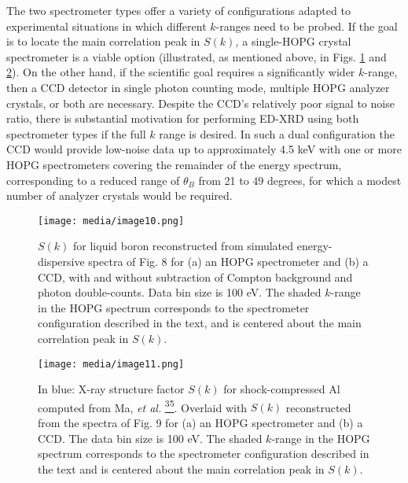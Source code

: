 The two spectrometer types offer a variety of configurations adapted to
experimental situations in which different \(k\)-ranges need to be
probed. If the goal is to locate the main correlation peak in
\(S(k)\)\emph{,} a single-HOPG crystal spectrometer is a viable option
(illustrated, as mentioned above, in Figs. \ref{edimage10} and \ref{edimage11}). On the other
hand, if the scientific goal requires a significantly wider \(k\)-range,
then a CCD detector in single photon counting mode, multiple HOPG
analyzer crystals, or both are necessary. Despite the CCD's relatively
poor signal to noise ratio, there is substantial motivation for
performing ED-XRD using both spectrometer types if the full \(k\) range
is desired. In such a dual configuration the CCD would provide low-noise
data up to approximately 4.5 keV with one or more HOPG spectrometers
covering the remainder of the energy spectrum, corresponding to a
reduced range of \(\theta_{B}\) from 21 to 49 degrees, for which a
modest number of analyzer crystals would be required.


\begin{figure} 
\caption{ \(S(k)\) for liquid boron
reconstructed from simulated energy-dispersive spectra of Fig. 8 for (a)
an HOPG spectrometer and (b) a CCD, with and without subtraction of
Compton background and photon double-counts. Data bin size is 100 eV.
The shaded \(k\)-range in the HOPG spectrum corresponds to the
spectrometer configuration described in the text, and is centered about
the main correlation peak in \(S(k)\).}
\label{edimage10}
\centering
\texttt{[image: media/image10.png]}
\end{figure}

\begin{figure}[h] 
\caption{ In blue: X-ray structure factor \(S(k)\) for shock-compressed
Al computed from Ma, \emph{et al.}
\hyperref[t.-ma-et-al.-physical-review-letters-110-065001-2013.]{\textsuperscript{35}}.
Overlaid with \(S(k)\) reconstructed from the spectra of Fig. 9 for (a)
an HOPG spectrometer and (b) a CCD. The data bin size is 100 eV. The
shaded \(k\)-range in the HOPG spectrum corresponds to the spectrometer
configuration described in the text and is centered about the main
correlation peak in \(S(k)\).}
\label{edimage11}
\centering
\texttt{[image: media/image11.png]}
\end{figure}




